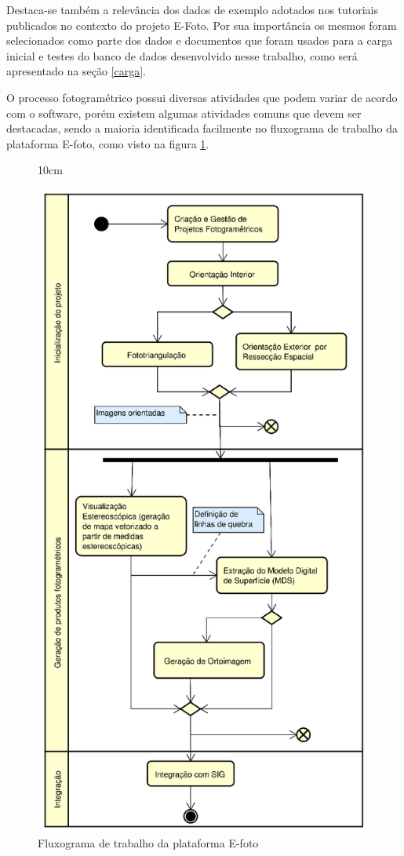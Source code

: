 Destaca-se também a relevância dos dados de exemplo adotados nos tutoriais publicados no contexto do projeto E-Foto. Por sua importância os mesmos foram selecionados como parte dos dados e documentos que foram usados para a carga inicial e testes do banco de dados desenvolvido nesse trabalho, como será apresentado na seção \ref{carga}.

O processo fotogramétrico possui diversas atividades que podem variar de acordo com o software, porém existem algumas atividades comuns que devem ser destacadas, sendo a maioria identificada facilmente no fluxograma de trabalho da plataforma E-foto, como visto na figura \ref{flux}.

\begin{figure}[!ht]{10cm}
  \caption{Fluxograma de trabalho da plataforma E-foto} \label{flux}
  \centering
  \includegraphics[width=1.2\textwidth, height=1.75\hsize]{figuras/efoto_flux.png}
\end{figure}

